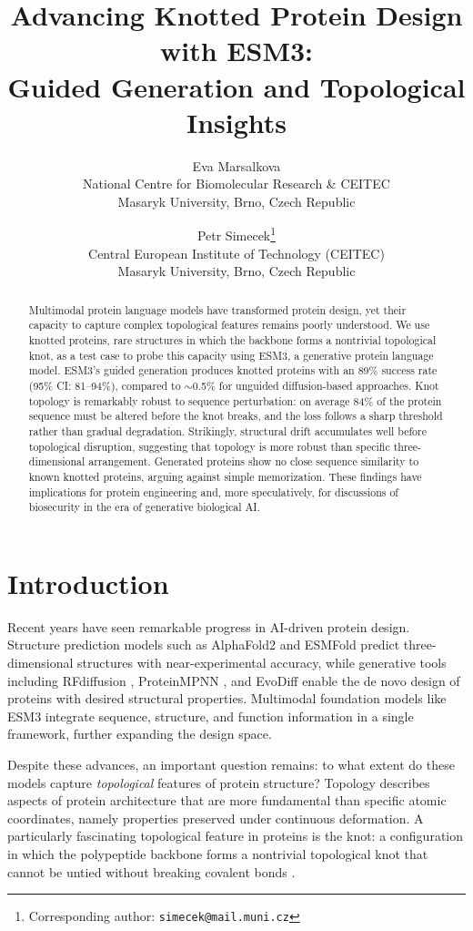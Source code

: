 \documentclass{article}
\title{Advancing Knotted Protein Design with ESM3:\\Guided Generation and Topological Insights}
\author{
   Eva Marsalkova \\
   National Centre for Biomolecular Research \& CEITEC \\
   Masaryk University, Brno, Czech Republic 
  \and
  Petr Simecek\thanks{Corresponding author: \texttt{simecek@mail.muni.cz}} \\
  Central European Institute of Technology (CEITEC)\\
  Masaryk University, Brno, Czech Republic
}
\date{}
\begin{document}
\maketitle

\begin{abstract}
Multimodal protein language models have transformed protein design, yet their capacity to capture complex topological features remains poorly understood. We use knotted proteins, rare structures in which the backbone forms a nontrivial topological knot, as a test case to probe this capacity using ESM3, a generative protein language model. ESM3's guided generation produces knotted proteins with an 89\% success rate (95\% CI: 81--94\%), compared to $\sim$0.5\% for unguided diffusion-based approaches. Knot topology is remarkably robust to sequence perturbation: on average 84\% of the protein sequence must be altered before the knot breaks, and the loss follows a sharp threshold rather than gradual degradation. Strikingly, structural drift accumulates well before topological disruption, suggesting that topology is more robust than specific three-dimensional arrangement. Generated proteins show no close sequence similarity to known knotted proteins, arguing against simple memorization. These findings have implications for protein engineering and, more speculatively, for discussions of biosecurity in the era of generative biological AI.
\end{abstract}

\section{Introduction}

Recent years have seen remarkable progress in AI-driven protein design. Structure prediction models such as AlphaFold2 \cite{abramson2024accurate} and ESMFold \cite{lin2023evolutionary} predict three-dimensional structures with near-experimental accuracy, while generative tools including RFdiffusion \cite{watson2023novo}, ProteinMPNN \cite{dauparas2022robust}, and EvoDiff \cite{alamdari2023protein} enable the de novo design of proteins with desired structural properties. Multimodal foundation models like ESM3 \cite{hayes2025simulating} integrate sequence, structure, and function information in a single framework, further expanding the design space.

Despite these advances, an important question remains: to what extent do these models capture \emph{topological} features of protein structure? Topology describes aspects of protein architecture that are more fundamental than specific atomic coordinates, namely properties preserved under continuous deformation. A particularly fascinating topological feature in proteins is the knot: a configuration in which the polypeptide backbone forms a nontrivial topological knot that cannot be untied without breaking covalent bonds \cite{taylor2000protein,virnau2006intricate}.
\end{document}
